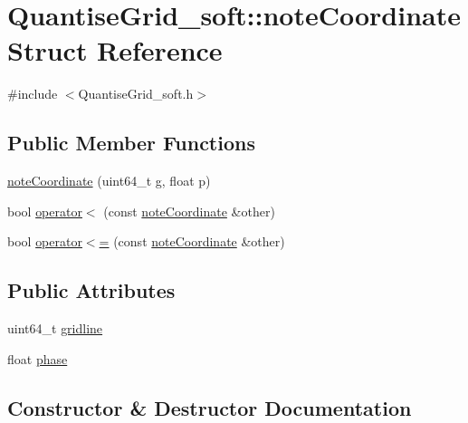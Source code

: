 \hypertarget{structQuantiseGrid__soft_1_1noteCoordinate}{}\section{Quantise\+Grid\+\_\+soft\+:\+:note\+Coordinate Struct Reference}
\label{structQuantiseGrid__soft_1_1noteCoordinate}


{\ttfamily \#include $<$Quantise\+Grid\+\_\+soft.\+h$>$}

\subsection*{Public Member Functions}
\begin{DoxyCompactItemize}
\item 
\hyperlink{structQuantiseGrid__soft_1_1noteCoordinate_a9ddd787e2a395a1d6243af0aecf48ff2}{note\+Coordinate} (uint64\+\_\+t g, float p)
\item 
bool \hyperlink{structQuantiseGrid__soft_1_1noteCoordinate_ac3edd1bb18b7294d6601f4f39d8fe913}{operator$<$} (const \hyperlink{structQuantiseGrid__soft_1_1noteCoordinate}{note\+Coordinate} \&other)
\item 
bool \hyperlink{structQuantiseGrid__soft_1_1noteCoordinate_a92b1eedbffb4215add5e127c18e8de24}{operator$<$=} (const \hyperlink{structQuantiseGrid__soft_1_1noteCoordinate}{note\+Coordinate} \&other)
\end{DoxyCompactItemize}
\subsection*{Public Attributes}
\begin{DoxyCompactItemize}
\item 
uint64\+\_\+t \hyperlink{structQuantiseGrid__soft_1_1noteCoordinate_a21b822d390f01aba9aa1fed2d5cc8a08}{gridline}
\item 
float \hyperlink{structQuantiseGrid__soft_1_1noteCoordinate_aee66a62adac6ba5afdd8a20fa28bf2be}{phase}
\end{DoxyCompactItemize}


\subsection{Constructor \& Destructor Documentation}
